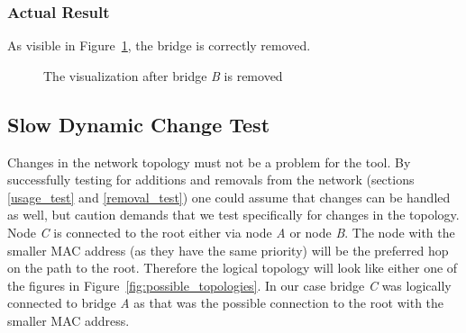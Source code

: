 \subsubsection*{Actual Result}
As visible in Figure~\ref{fig:removal}, the bridge is correctly removed.
\begin{figure}[h]
    \centering
    \caption{The visualization after bridge \textit{B} is removed}
    \label{fig:removal}
\end{figure}

\subsection*{Slow Dynamic Change Test}
\label{slow_dynamic_test}
Changes in the network topology must not be a problem for the tool.
By successfully testing for additions and removals from the network (sections \ref{usage_test} and \ref{removal_test}) one could assume that changes can be handled as well, but caution demands that we test specifically for changes in the topology.
Node \textit{C} is connected to the root either via node \textit{A} or node \textit{B}.
The node with the smaller MAC address (as they have the same priority) will be the preferred hop on the path to the root.
Therefore the logical topology will look like either one of the figures in Figure~\ref{fig:possible_topologies}.
In our case bridge \textit{C} was logically connected to bridge \textit{A} as that was the possible connection to the root with the smaller MAC address.


